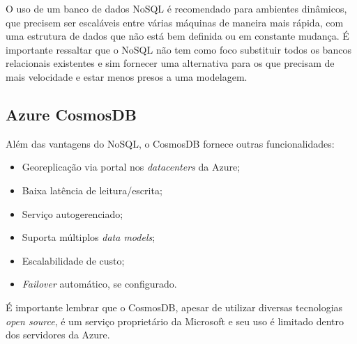 \documentclass[12pt]{article}
\begin{document}
O uso de um banco de dados NoSQL é recomendado para ambientes dinâmicos, que precisem ser escaláveis entre várias máquinas de maneira mais rápida, com uma estrutura de dados que não está bem 
definida ou em constante mudança. É importante ressaltar que o NoSQL não tem como foco substituir todos os bancos relacionais existentes e sim fornecer uma alternativa para os que 
precisam de mais velocidade e estar menos presos a uma modelagem. 

\subsection{Azure CosmosDB}
Além das vantagens do NoSQL, o CosmosDB fornece outras funcionalidades:

\begin{itemize}
	\item Georeplicação via portal nos \textit{datacenters} da Azure;
	\item Baixa latência de leitura/escrita;
	\item Serviço autogerenciado;
	\item Suporta múltiplos \textit{data models};
	\item Escalabilidade de custo;
	\item \textit{Failover} automático, se configurado.
\end{itemize}

É importante lembrar que o CosmosDB, apesar de utilizar diversas tecnologias \textit{open source}, é um serviço proprietário da Microsoft e seu uso é limitado dentro dos 
servidores da Azure.


\end{document}
